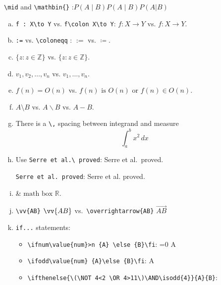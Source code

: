 \documentclass[a4paper,12pt]{amsart}
\theoremstyle{plain}
\theoremstyle{definition}
\theoremstyle{remark}
\numberwithin{equation}{section} %
\newcommand{\bbR}{\mathbb{R}}
\newcommand{\bbZ}{\mathbb{Z}}
\begin{document}
\verb|\mid| and \verb|\mathbin{}|	:$ P(A \mid B) P(A \mathbin{\vert} B )  P(A | B)  $
\begin{enumerate}[(a)]
	\item \verb|f : X\to Y| vs. \verb|f\colon X\to Y|: $ f : X\to Y $ vs. $ f\colon X\to Y $.

	\item \verb|:=| vs. \verb|\coloneqq| : $ :=  $ vs. $ \coloneqq $.

	\item $ \lbrace z : z \in \bbZ \rbrace $ vs. $ \lbrace z \colon z \in \bbZ \rbrace $.

	\item $ v_{1}, v_{2}, \dotsc,v_{n} $ vs. $ v_{1},\dotsc,v_{n} $.

	\item $ f(n) = O(n) $ vs. $ f(n) \text{ is } O(n)$ or $ f(n)\in O(n) $.

	\item $ A\setminus B $ vs. $ A\backslash B $ vs. $ A-B $.

	\item There is a \verb|\,| spacing between integrand and measure
	      \[ \int_{a}^{b} x^2 \,dx \]

	\item Use \verb|Serre et al.\ proved|: Serre et al.\ proved.

	      \verb|Serre et al. proved|: Serre et al. proved.

	\item {} \& $ \boxed{\text{math box } \boxed{\bbR}} $.

	\item \verb|\vv{AB}| $ \vv{AB} $ vs.\ \verb|\overrightarrow{AB}|  $ \overrightarrow{AB} $

	\item \verb|if...| statements: 
	      \begin{itemize}
		      \item \verb|\ifnum\value{num}>n {A} \else {B}\fi|:
		            \ifnum\value{num}=0 {A} \fi

		      \item \verb|\ifodd\value{num} {A}\else {B}\fi|: \ifodd\value{num} {A} \fi

		      \item \verb||: \ifthenelse{\(\NOT 4<2 \OR 4>11\)\AND\isodd{4}}{A}{B}
	      \end{itemize}


\end{enumerate}
\end{document}

